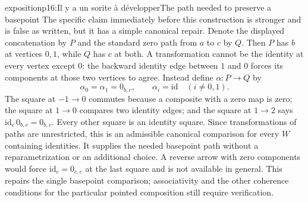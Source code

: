 \begin{dcomment}{exposition}{p16:Il y a un sorite à développer}{The path needed to preserve a basepoint}
The specific claim immediately before this construction is stronger and is false as written, but it has a simple canonical repair. Denote the displayed concatenation by $P$ and the standard zero path from $a$ to $c$ by $Q$. Then $P$ has $b$ at vertices $0,1$, while $Q$ has $c$ at both. A transformation cannot be the identity at every vertex except $0$: the backward identity edge between $1$ and $0$ forces its components at those two vertices to agree. Instead define $\alpha:P\to Q$ by
\[
 \alpha_0=\alpha_1=0_{b,c},\qquad
 \alpha_i=\mathrm{id}\quad(i\ne0,1).
\]
The square at $-1\to0$ commutes because a composite with a zero map is zero; the square at $1\to0$ compares two identity edges; and the square at $1\to2$ says $\mathrm{id}_c\,0_{b,c}=0_{b,c}$. Every other square is an identity square. Since transformations of paths are unrestricted, this is an admissible canonical comparison for every $W$ containing identities. It supplies the needed basepoint path without a reparametrization or an additional choice. A reverse arrow with zero components would force $\mathrm{id}_c=0_{c,c}$ at the last square and is not available in general. This repairs the single basepoint comparison; associativity and the other coherence conditions for the particular pointed composition still require verification.
\end{dcomment}

